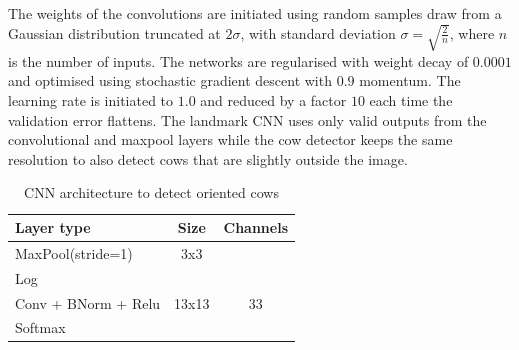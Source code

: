 \documentclass[10pt,a4paper,twocolumn]{article}
\begin{document}
The weights of the convolutions are initiated using random samples draw from a Gaussian
distribution truncated at $2\sigma$, with standard deviation $\sigma=\sqrt{\frac{2}{n}}$,
where $n$ is the number of inputs\cite{DBLP:journals/corr/HeZR015}. The networks are regularised with weight decay of
$0.0001$ and optimised using stochastic gradient descent with $0.9$ momentum. The
learning rate is initiated to $1.0$ and reduced by a factor $10$ each time the validation
error flattens. The landmark CNN uses only valid outputs from the convolutional and maxpool
layers while the cow detector keeps the same resolution to also detect cows that are
slightly outside the image.

\begin{table}
\begin{center}
\begin{tabular}{|l|c|c|}
\hline
\textbf{Layer type} & \textbf{Size} & \textbf{Channels} \\
\hline

MaxPool(stride=1) & 3x3 &  \\
Log & & \\
Conv + BNorm + Relu & 13x13 & 33 \\
Softmax & & \\
\hline
\end{tabular}
\end{center}
\caption{CNN architecture to detect oriented cows
}
\label{tab:cowdirnet}
\end{table}
\end{document}
